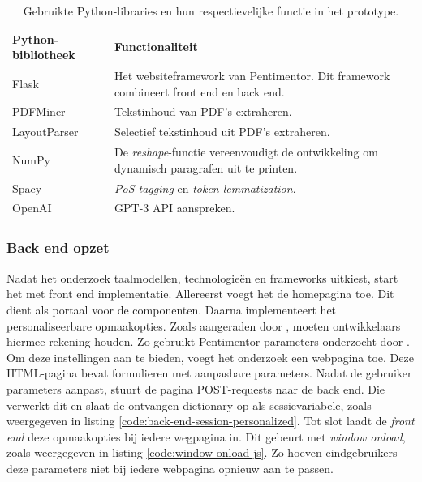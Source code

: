 \begin{center}
	\begin{table}[H]
	\begin{tabular}{ | m{4cm} | m{11cm} | } 
		\hline
		\textbf{Python-bibliotheek} & \textbf{Functionaliteit} \\
		\hline
		Flask					& Het websiteframework van Pentimentor. Dit framework combineert front end en back end. \\ 
		\hline
		PDFMiner 				& Tekstinhoud van PDF's extraheren. \\ 
		\hline
		LayoutParser			& Selectief tekstinhoud uit PDF's extraheren. \\
		\hline
		NumPy 					& De \textit{reshape}-functie vereenvoudigt de ontwikkeling om dynamisch paragrafen uit te printen. \\
		\hline		
		Spacy 					& \textit{PoS-tagging} en \textit{token lemmatization}. \\
		\hline
		OpenAI					& GPT-3 API aanspreken. \\
		\hline
	\end{tabular}
	\caption{Gebruikte Python-libraries en hun respectievelijke functie in het prototype.}
	\label{table:python-libraries}
	\end{table}
\end{center}

\subsubsection{Back end opzet}

Nadat het onderzoek taalmodellen, technologieën en frameworks uitkiest, start het met front end implementatie. Allereerst voegt het de homepagina toe. Dit dient als portaal voor de componenten. Daarna implementeert het personaliseerbare opmaakopties. Zoals aangeraden door \textcite{Galliussi2020}, moeten ontwikkelaars hiermee rekening houden. Zo gebruikt Pentimentor parameters onderzocht door \textcite{Rello2013a, Rello2013b}. Om deze instellingen aan te bieden, voegt het onderzoek een webpagina toe. Deze HTML-pagina bevat formulieren met aanpasbare parameters. Nadat de gebruiker parameters aanpast, stuurt de pagina POST-requests naar de back end. Die verwerkt dit en slaat de ontvangen dictionary op als sessievariabele, zoals weergegeven in listing \ref{code:back-end-session-personalized}. Tot slot laadt de \textit{front end} deze opmaakopties bij iedere wegpagina in. Dit gebeurt met \textit{window onload}, zoals weergegeven in listing \ref{code:window-onload-js}. Zo hoeven eindgebruikers deze parameters niet bij iedere webpagina opnieuw aan te passen.


